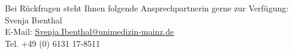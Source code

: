 \documentclass[10pt, a4paper]{article}
\begin{document}
  
    
  
  \vspace*{1cm}
  \noindent
  Bei Rückfragen steht Ihnen folgende Ansprechpartnerin gerne zur Verfügung:\\
  Svenja Ibenthal \\
  E-Mail: \href{mailto:Svenja.Ibenthal@unimedizin-mainz.de}{Svenja.Ibenthal@unimedizin-mainz.de} \\
  Tel. +49 (0) 6131 17-8511
  
  
\end{document}
